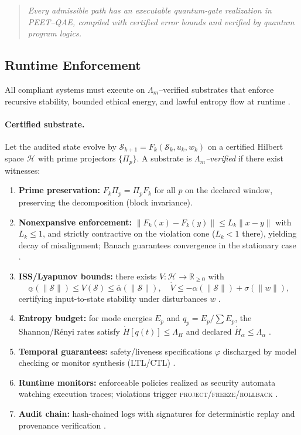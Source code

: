 \documentclass[12pt]{amsart}
\theoremstyle{plain}
\begin{document}
\begin{quote}
\textit{Every admissible path has an executable quantum-gate realization in PEET–QAE, compiled with certified error bounds and verified by quantum program logics.}
\end{quote}

\subsection{Runtime Enforcement}

All compliant systems must execute on $\Lambda_m$–verified substrates that enforce recursive stability, bounded ethical energy, and lawful entropy flow at runtime \cite{vanGelder2025pirtm}.

\paragraph{Certified substrate.}
Let the audited state evolve by $\mathcal{S}_{k+1}=F_k(\mathcal{S}_k,u_k,w_k)$ on a certified Hilbert space $\mathcal{H}$ with prime projectors $\{\Pi_p\}$. A substrate is \emph{$\Lambda_m$–verified} if there exist witnesses:
\begin{enumerate}
  \item \textbf{Prime preservation:} $F_k\Pi_p=\Pi_pF_k$ for all $p$ on the declared window, preserving the decomposition (block invariance).
  \item \textbf{Nonexpansive enforcement:} $\|F_k(x)-F_k(y)\|\le L_k\|x-y\|$ with $L_k\le 1$, and strictly contractive on the violation cone ($L_k<1$ there), yielding decay of misalignment; Banach guarantees convergence in the stationary case \cite{granas2003fixed}.
  \item \textbf{ISS/Lyapunov bounds:} there exists $V:\mathcal{H}\!\to\!\mathbb{R}_{\ge0}$ with
  \[
  \underline{\alpha}(\|\mathcal{S}\|)\le V(\mathcal{S})\le \overline{\alpha}(\|\mathcal{S}\|),\quad
  \dot V\le -\alpha(\|\mathcal{S}\|)+\sigma(\|w\|),
  \]
  certifying input-to-state stability under disturbances $w$ \cite{sontag1989iss,khalil2002nonlinear}.
  \item \textbf{Entropy budget:} for mode energies $E_p$ and $q_p=E_p/\sum E_p$, the Shannon/Rényi rates satisfy $\dot H[q(t)]\le \Lambda_H$ and declared $\dot H_\alpha\le \Lambda_\alpha$ \cite{cover2006elements}.
  \item \textbf{Temporal guarantees:} safety/liveness specifications $\varphi$ discharged by model checking or monitor synthesis (LTL/CTL) \cite{clarke1999model,baier2008model}.
  \item \textbf{Runtime monitors:} enforceable policies realized as security automata watching execution traces; violations trigger \textsc{project}/\textsc{freeze}/\textsc{rollback} \cite{schneider2000enforceable,boyd2004convex}.
  \item \textbf{Audit chain:} hash-chained logs with signatures for deterministic replay and provenance verification \cite{merkle1989certified}.
\end{enumerate}
\end{document}
